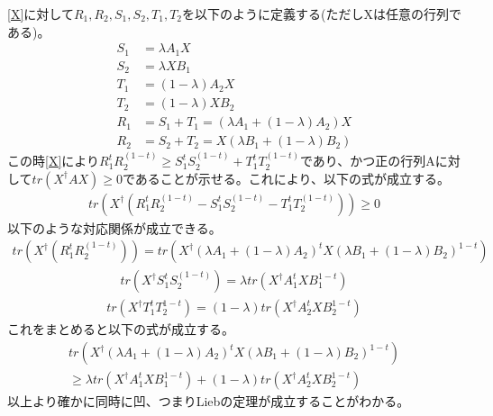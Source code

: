 \documentclass[a4paper,10.5pt]{article}
\numberwithin{equation}{section}
\begin{document}
\eqref{X}に対して$R_{1},R_{2},S_{1},S_{2},T_{1},T_{2}$を以下のように定義する(ただしXは任意の行列である)。
\begin{equation}\begin{split}
    S_{1} &= \lambda A_{1}X\\
    S_{2} &= \lambda XB_{1}\\
    T_{1} &= (1-\lambda)A_{2}X\\
    T_{2} &= (1-\lambda)XB_{2}\\
    R_{1} &= S_{1}+T_{1}=(\lambda A_{1}+(1-\lambda)A_{2})X\\
    R_{2} &= S_{2}+T_{2}=X(\lambda B_{1}+(1-\lambda)B_{2})
\end{split} \end{equation}
この時\eqref{X}により$R_{1}^{t}R_{2}^{(1-t)}\geq S_{1}^{t}S_{2}^{(1-t)} + T_{1}^{t}T_{2}^{(1-t)}$であり、かつ正の行列Aに対して$tr(X^{\dagger}AX)\geq 0$であることが示せる。これにより、以下の式が成立する。
\begin{equation}\begin{split}
    tr(X^{\dagger}(R_{1}^{t}R_{2}^{(1-t)} - S_{1}^{t}S_{2}^{(1-t)} - T_{1}^{t}T_{2}^{(1-t)}))\geq 0
\end{split} \end{equation}
以下のような対応関係が成立できる。
\begin{equation}\begin{split}
    tr(X^{\dagger}(R_{1}^{t}R_{2}^{(1-t)}))
    =tr(X^{\dagger}(\lambda A_{1}+(1-\lambda)A_{2})^{t}X(\lambda B_{1}+(1-\lambda)B_{2})^{1-t})
\end{split} \end{equation}
\begin{equation}\begin{split}
    tr(X^{\dagger} S_{1}^{t}S_{2}^{(1-t)})
    =\lambda tr(X^{\dagger}A_{1}^{t}XB_{1}^{1-t})
\end{split} \end{equation}
\begin{equation}\begin{split}
    tr(X^{\dagger}T_{1}^{t}T_{2}^{1-t})
    =(1-\lambda)tr(X^{\dagger}A_{2}^{t}XB_{2}^{1-t})
\end{split} \end{equation}
これをまとめると以下の式が成立する。
\begin{equation}\begin{split}
    tr(X^{\dagger}(\lambda A_{1}+(1-\lambda)A_{2})^{t}X(\lambda B_{1}+(1-\lambda)B_{2})^{1-t})\\
    \geq \lambda tr(X^{\dagger}A_{1}^{t}XB_{1}^{1-t}) + (1-\lambda)tr(X^{\dagger}A_{2}^{t}XB_{2}^{1-t})
\end{split} \end{equation}
以上より確かに同時に凹、つまりLiebの定理が成立することがわかる。
\end{document}
